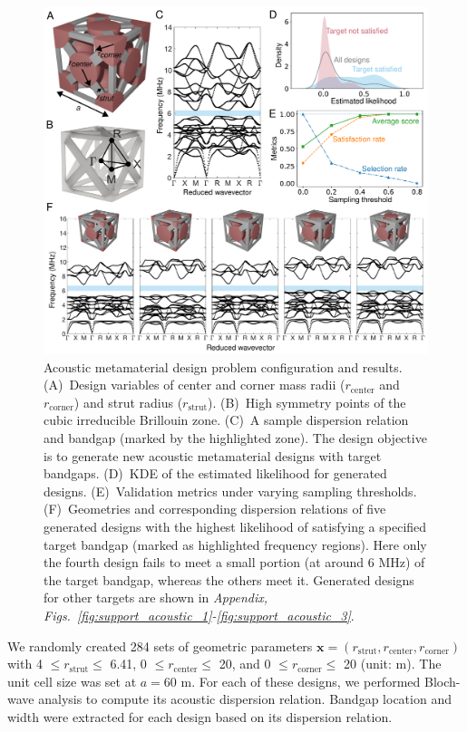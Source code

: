 \documentclass{article}
\begin{document}
\begin{figure}[h]
\centering
\includegraphics[width=.8\textwidth]{fig/acoustic.pdf}
\caption{Acoustic metamaterial design problem configuration and results. (A)~Design variables of center and corner mass radii ($r_\text{center}$ and $r_\text{corner}$) and strut radius ($r_\text{strut}$). (B)~High symmetry points of the cubic irreducible Brillouin zone. (C)~A sample dispersion relation and bandgap (marked by the highlighted zone). The design objective is to generate new acoustic metamaterial designs with target bandgaps. (D)~KDE of the estimated likelihood for generated designs. (E)~Validation metrics under varying sampling thresholds. (F)~Geometries and corresponding dispersion relations of five generated designs with the highest likelihood of satisfying a specified target bandgap (marked as highlighted frequency regions). Here only the fourth design fails to meet a small portion (at around 6 MHz) of the target bandgap, whereas the others meet it. Generated designs for other targets are shown in \textit{Appendix, Figs.~\ref{fig:support_acoustic_1}-\ref{fig:support_acoustic_3}}.
}
\label{fig:acoustic}
\end{figure}

We randomly created 284 sets of geometric parameters $\mathbf{x} = (r_\text{strut}, r_\text{center}, r_\text{corner})$ with 4 $\leq r_\text{strut} \leq$ 6.41, 0 $\leq r_\text{center} \leq$ 20, and 0 $\leq r_\text{corner} \leq$ 20 (unit: \textmu m). The unit cell size was set at $a=60$ \textmu m. For each of these designs, we performed Bloch-wave analysis to compute its acoustic dispersion relation. 
Bandgap location and width were extracted for each design based on its dispersion relation. 
\end{document}

